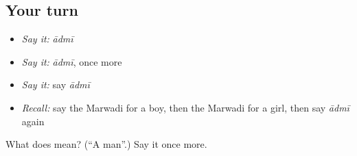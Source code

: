 \subsection*{Your turn}
\begin{itemize}
\raggedright
  \item \emph{Say it:} \emph{ādmī}
  \item \emph{Say it:} \emph{ādmī}, once more
  \item \emph{Say it:} say \emph{ādmī}
  \item \emph{Recall:} say the Marwadi for a boy, then the Marwadi for a girl, then say \emph{ādmī} again
\end{itemize}

\begin{tcolorbox}[breakable,colback=teal!4,colframe=teal!35!black,title={Before you move on}]
What does  mean? (\textquotedblleft{}A man\textquotedblright{}.) Say it once more.
\end{tcolorbox}
